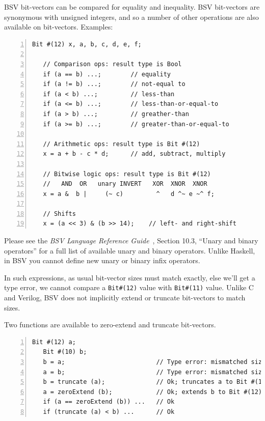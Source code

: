 BSV bit-vectors can be compared for equality and inequality.  BSV
bit-vectors are synonymous with unsigned integers, and so a number of
other operations are also available on bit-vectors.  Examples:


\begin{Verbatim}[frame=single, numbers=left]
   Bit #(12) x, a, b, c, d, e, f;

   // Comparison ops: result type is Bool
   if (a == b) ...;        // equality
   if (a != b) ...;        // not-equal to
   if (a < b) ...;         // less-than
   if (a <= b) ...;        // less-than-or-equal-to
   if (a > b) ...;         // greather-than
   if (a >= b) ...;        // greater-than-or-equal-to

   // Arithmetic ops: result type is Bit #(12)
   x = a + b - c * d;      // add, subtract, multiply

   // Bitwise logic ops: result type is Bit #(12)
   //   AND  OR   unary INVERT   XOR  XNOR  XNOR
   x = a &  b |     (~ c)         ^   d ^~ e ~^ f;

   // Shifts
   x = (a << 3) & (b >> 14);    // left- and right-shift
\end{Verbatim}

Please see the \emph{BSV Language Reference Guide}~\cite{BLang2000},
Section 10.3, ``Unary and binary operators'' for a full list of
available unary and binary operators.  Unlike Haskell, in BSV you
cannot define new unary or binary infix operators.

In such expressions, as usual bit-vector sizes must match exactly,
else we'll get a type error, {\eg} we cannot compare a
\verb|Bit#(12)| value with \verb|Bit#(11)| value.  Unlike C and
Verilog, BSV does not implicitly extend or truncate bit-vectors to
match sizes.


Two functions are available to zero-extend and truncate bit-vectors.
\begin{Verbatim}[frame=single, numbers=left]
   Bit #(12) a;
   Bit #(10) b;
   b = a;                         // Type error: mismatched sizes
   a = b;                         // Type error: mismatched sizes
   b = truncate (a);              // Ok; truncates a to Bit #(10), then assigns
   a = zeroExtend (b);            // Ok; extends b to Bit #(12), then assigns
   if (a == zeroExtend (b)) ...   // Ok
   if (truncate (a) < b) ...      // Ok
\end{Verbatim}

